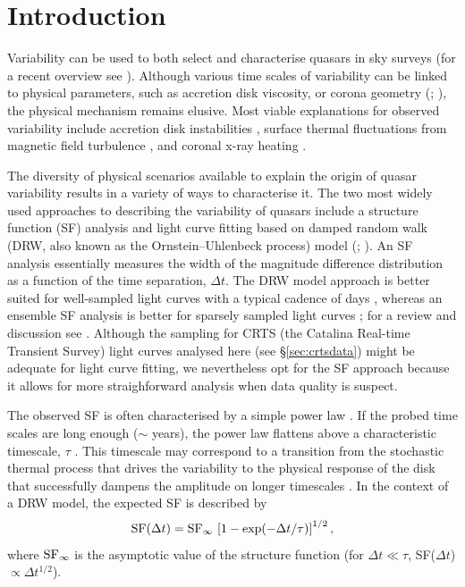 \documentclass[fleqn,usenatbib]{mnras}
\begin{document}
\section{Introduction}
Variability can be used to both select and characterise quasars in sky surveys (for a recent overview see \citealt{lawrence2016a}). Although various time scales of variability can be linked to physical parameters, such as accretion disk viscosity, or corona geometry (\citealt{kelly2011}; \citealt{graham2014}), the physical mechanism remains elusive. Most viable explanations for observed
variability include accretion disk instabilities \citep{kawaguchi1998}, surface thermal fluctuations from magnetic field turbulence \citep{kelly2009}, and
coronal x-ray heating \citep[][see \citealt{kozlowski2016} for a review]{kelly2011}.

The diversity of  physical scenarios available to explain the origin of quasar variability results in a variety of ways to characterise it. The two most widely used approaches to describing the variability of quasars include a structure function (SF) analysis and light curve
fitting based on damped random walk (DRW, also known as the Ornstein--Uhlenbeck process) model (\citealt{kelly2007}; \citealt{macleod2011}). An SF analysis essentially measures the 
width of the magnitude difference distribution as a function of the time separation, $\Delta t$. 
The DRW model approach is better suited for well-sampled light curves with a typical cadence of days \citep{zu2013, kozlowski2016}, whereas an ensemble SF analysis is better for sparsely sampled light curves \citep{hawkins2002, berk2004,  devries2005}; for a review and discussion see \cite{kozlowski2016}. Although the sampling for CRTS (the Catalina Real-time Transient Survey) light curves 
analysed here (see \S\ref{sec:crtsdata}) might be adequate for light curve fitting, we nevertheless opt for 
the SF approach because it allows for more straighforward analysis when data quality is suspect. 

The observed SF is often characterised by a simple power law \citep{schmidt2010}. If the probed time scales are long enough 
($\sim$ years), the power law flattens above a characteristic timescale, $\tau$ \citep{2004Ivezic, kelly2007, macleod2010}.
This timescale may correspond to a transition from the stochastic thermal process that drives the variability to the physical 
response of the disk that successfully  dampens the amplitude on longer timescales \citep{peterson2001, kelly2007, kelly2009, 
kelly2011, lawrence2016a}. In the context of a DRW model, the expected SF is described by 
\begin{equation}
\label{eq:DRWSF}
        {\rm SF}(\Delta t) = {\rm SF}_\infty \, \left[1 - \exp(-\Delta t / \tau) \right]^{1/2},
\end{equation}
where ${\rm SF}_\infty$ is the asymptotic value of the structure function (for $\Delta t \ll \tau$, SF($\Delta t$) $\propto \Delta t^{1/2}$). 
\end{document}
